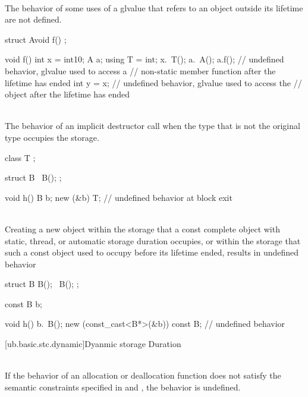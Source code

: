 \pnum
{} \\
The behavior of some uses of a glvalue
that refers to an object outside its lifetime
are not defined.

\pnum
\begin{example}
\begin{codeblock}
struct A{void f(){} };

void f() {
  int x = int{10};
  A a;
  using T = int;
  x.~T();
  a.~A();
  a.f();        // undefined behavior, glvalue used to access a
                // non-static member function after the lifetime has ended
  int y = x;    // undefined behavior, glvalue used to access the
                // object after the lifetime has ended
}
\end{codeblock}
\end{example}


\pnum
{} \\
The behavior of an implicit destructor call when the type that is not
the original type occupies the storage.

\pnum
\begin{example}
\begin{codeblock}
class T {};

struct B {
  ~B();
};

void h() {
  B b;
  new (&b) T;
}               // undefined behavior at block exit
\end{codeblock}
\end{example}


\pnum
{} \\
Creating a new object within the storage that a const complete object with static, thread, or automatic
storage duration occupies, or within the storage that such a const object used to occupy before its lifetime
ended, results in undefined behavior

\pnum
\begin{example}
\begin{codeblock}
struct B {
  B();
  ~B();
};

const B b;

void h() {
  b.~B();
  new (const_cast<B*>(&b)) const B; // undefined behavior
}
\end{codeblock}
\end{example}


[ub.basic.stc.dynamic]{Dyanmic storage Duration}

\pnum
{} \\
If the behavior of an allocation or deallocation function does not satisfy the semantic constraints specified
in  and , the behavior is undefined.

